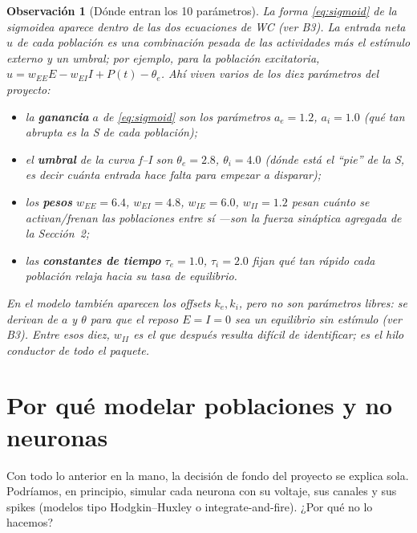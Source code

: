 \documentclass[11pt,a4paper]{article}
\newtheorem{remark}{Observación}
\begin{document}
\begin{remark}[Dónde entran los 10 parámetros]
La forma \eqref{eq:sigmoid} de la sigmoidea aparece dentro de las dos ecuaciones
de WC (ver B3). La entrada neta $u$ de cada población es una combinación pesada
de las actividades más el estímulo externo y un umbral; por ejemplo, para la
población excitatoria, $u = w_{EE}E - w_{EI}I + P(t) - \theta_e$. Ahí viven
varios de los diez parámetros del proyecto:
\begin{itemize}[nosep]
  \item la \textbf{ganancia} $a$ de \eqref{eq:sigmoid} son los parámetros
  $a_e=1.2$, $a_i=1.0$ (qué tan abrupta es la S de cada población);
  \item el \textbf{umbral} de la curva f--I son $\theta_e=2.8$, $\theta_i=4.0$
  (dónde está el ``pie'' de la S, es decir cuánta entrada hace falta para
  empezar a disparar);
  \item los \textbf{pesos} $w_{EE}=6.4$, $w_{EI}=4.8$, $w_{IE}=6.0$,
  $w_{II}=1.2$ pesan cuánto se activan/frenan las poblaciones entre sí ---son la
  fuerza sináptica agregada de la Sección~2;
  \item las \textbf{constantes de tiempo} $\tau_e=1.0$, $\tau_i=2.0$ fijan qué
  tan rápido cada población relaja hacia su tasa de equilibrio.
\end{itemize}
En el modelo también aparecen los \emph{offsets} $k_e, k_i$, pero no son
parámetros libres: se derivan de $a$ y $\theta$ para que el reposo $E=I=0$ sea
un equilibrio sin estímulo (ver B3). Entre esos diez, $w_{II}$ es el que después
resulta difícil de identificar; es el hilo conductor de todo el paquete.
\end{remark}

\section{Por qué modelar poblaciones y no neuronas}

Con todo lo anterior en la mano, la decisión de fondo del proyecto se explica
sola. Podríamos, en principio, simular cada neurona con su voltaje, sus canales
y sus spikes (modelos tipo Hodgkin--Huxley o integrate-and-fire). ¿Por qué no lo
hacemos?
\end{document}
